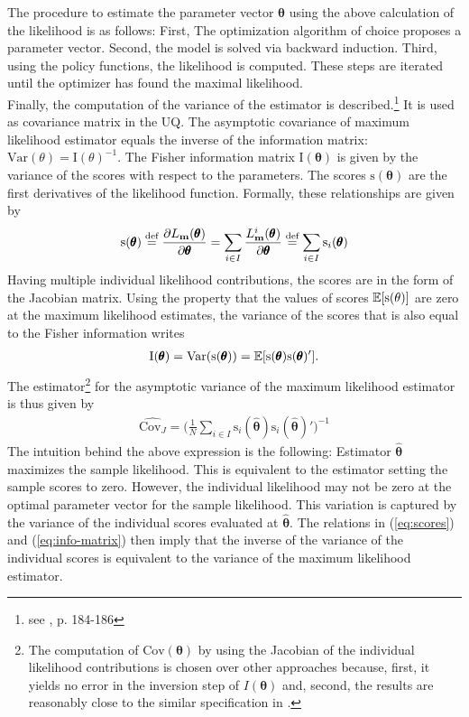 The procedure to estimate the parameter vector $\pmb{\theta}$ using the above calculation of the likelihood is as follows: First, The optimization algorithm of choice proposes a parameter vector. Second, the model is solved via backward induction. Third, using the policy functions, the likelihood is computed. These steps are iterated until the optimizer has found the maximal likelihood. 
\\

Finally, the computation of the variance of the estimator is described.\footnote{see \cite{Verbeek.2012}, p. 184-186} It is used as covariance matrix in the UQ. The asymptotic covariance of maximum likelihood estimator equals the inverse of the information matrix: $\text{Var}(\theta)=\text{I}(\theta)^{-1}$. The Fisher information matrix $\text{I}(\pmb{\theta})$ is given by the variance of the scores with respect to the parameters. The scores $\text{s}(\pmb{\theta})$ are the first derivatives of the likelihood function. Formally, these relationships are given by
\begin{align} \label{eq:scores}
\text{s}(\pmb{\theta}) \stackrel{\text{def}}{=} \frac{\partial L_{\bold{m}}({\pmb{\theta}})} {\partial \pmb{\theta}} = \sum_{i \in I} \frac{L_{\bold{m}}^{i}(\pmb{\theta})}{\partial \pmb{\theta}} \stackrel{\text{def}}{=} \sum_{i \in I}\text{s}_i(\pmb{\theta})
\end{align}
Having multiple individual likelihood contributions, the scores are in the form of the  Jacobian matrix.
Using the property that the values of scores $\operatorname*{\mathbb{E}}[\text{s}(\theta)]$ are zero at the maximum likelihood estimates, the variance of the scores that is also equal to the Fisher information writes
\begin{align} \label{eq:info-matrix}
\text{I}(\pmb{\theta}) = \text{Var}(\text{s}(\pmb{\theta})) = \operatorname*{\mathbb{E}}[\text{s}(\pmb{\theta})\text{s}(\pmb{\theta})'].
\end{align}
The estimator\footnote{The computation of $\text{Cov}(\pmb{\theta})$ by using the Jacobian of the individual likelihood contributions is chosen over other approaches because, first, it yields no error in the inversion step of $I(\pmb{\theta})$ and, second, the results are reasonably close to the similar specification in \cite{Keane.1994}.} for the asymptotic variance of the maximum likelihood estimator is thus given by
\begin{align}
\hat{\text{Cov}_J} = \bigg( \frac{1}{N} \sum_{i \in I} \text{s}_i(\pmb{\hat{\theta}})\text{s}_i(\pmb{\hat{\theta}})' \bigg)^{-1}
\end{align}
The intuition behind the above expression is the following: Estimator $\pmb{\hat{\theta}}$ maximizes the sample likelihood. This is equivalent to the estimator setting the sample scores to zero. However, the individual likelihood may not be zero at the optimal parameter vector for the sample likelihood. This variation is captured by the variance of the individual scores evaluated at $\pmb{\hat{\theta}}$. The relations in (\ref{eq:scores}) and (\ref{eq:info-matrix}) then imply that the inverse of the variance of the individual scores is equivalent to the variance of the maximum likelihood estimator.
